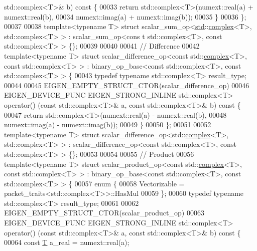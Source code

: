 \begin{DoxyCode}
      std::complex<T>& b)\textcolor{keyword}{ const }\{
00033     \textcolor{keywordflow}{return} std::complex<T>(numext::real(a) + numext::real(b),
00034                            numext::imag(a) + numext::imag(b));
00035   \}
00036 \};
00037 
00038 \textcolor{keyword}{template}<\textcolor{keyword}{typename} T> \textcolor{keyword}{struct }scalar\_sum\_op<\hyperlink{namespacestd}{std}::\hyperlink{structcomplex}{complex}<T>, std::complex<T> > : scalar\_sum\_op<cons
      t std::complex<T>, const std::complex<T> > \{\};
00039 
00040 
00041 \textcolor{comment}{// Difference}
00042 \textcolor{keyword}{template}<\textcolor{keyword}{typename} T> \textcolor{keyword}{struct }scalar\_difference\_op<const std::\hyperlink{structcomplex}{complex}<T>, const std::complex<T> >  : 
      binary\_op\_base<const std::complex<T>, const std::complex<T> > \{
00043   \textcolor{keyword}{typedef} \textcolor{keyword}{typename} std::complex<T> result\_type;
00044 
00045   EIGEN\_EMPTY\_STRUCT\_CTOR(scalar\_difference\_op)
00046   EIGEN\_DEVICE\_FUNC EIGEN\_STRONG\_INLINE std::complex<T> operator() (\textcolor{keyword}{const} std::complex<T>& a, \textcolor{keyword}{const} 
      std::complex<T>& b)\textcolor{keyword}{ const }\{
00047     \textcolor{keywordflow}{return} std::complex<T>(numext::real(a) - numext::real(b),
00048                            numext::imag(a) - numext::imag(b));
00049   \}
00050 \};
00051 
00052 \textcolor{keyword}{template}<\textcolor{keyword}{typename} T> \textcolor{keyword}{struct }scalar\_difference\_op<std::\hyperlink{structcomplex}{complex}<T>, std::complex<T> > : 
      scalar\_difference\_op<const std::complex<T>, const std::complex<T> > \{\};
00053 
00054 
00055 \textcolor{comment}{// Product}
00056 \textcolor{keyword}{template}<\textcolor{keyword}{typename} T> \textcolor{keyword}{struct }scalar\_product\_op<const std::\hyperlink{structcomplex}{complex}<T>, const std::complex<T> >  : 
      binary\_op\_base<const std::complex<T>, const std::complex<T> > \{
00057   \textcolor{keyword}{enum} \{
00058     Vectorizable = packet\_traits<std::complex<T>>::HasMul
00059   \};
00060   \textcolor{keyword}{typedef} \textcolor{keyword}{typename} std::complex<T> result\_type;
00061 
00062   EIGEN\_EMPTY\_STRUCT\_CTOR(scalar\_product\_op)
00063   EIGEN\_DEVICE\_FUNC EIGEN\_STRONG\_INLINE std::complex<T> operator() (\textcolor{keyword}{const} std::complex<T>& a, \textcolor{keyword}{const} 
      std::complex<T>& b)\textcolor{keyword}{ const }\{
00064     \textcolor{keyword}{const} \hyperlink{group___sparse_core___module_class_eigen_1_1_triplet}{T} a\_real = numext::real(a);

\end{DoxyCode}
